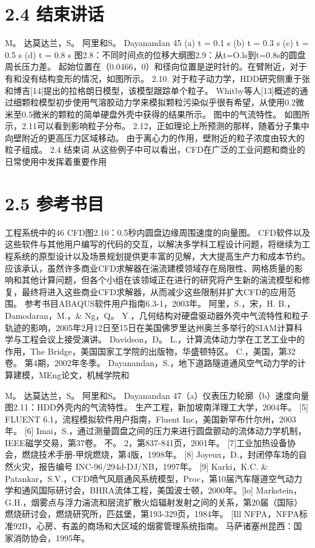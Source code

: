 \documentclass[UTF8,11pt,a4paper,openany,fontset=fandol]{ctexbook}
\begin{document}
\section{2.4 结束讲话}
M。 达莫达兰，S。 阿里和S。 Dayanandan 45 (a) t = 0.1 s (b) t = 0.3 s (c) t = 0.5 s (d) t = 0.8 s 图2.8：不同时间点的位移大纲图2.9：从t=O.ls到t=0.8s的圆盘周长压力差。 起始位置在（0.0466，0）和径向位置是逆时针的。在臂附近，对于有和没有结构变形的情况，如图所示。 2.10. 对于粒子动力学，HDD研究侧重于张和博吉[14]提出的拉格朗日模型，该模型跟踪单个粒子。 Whitby等人[13]概述的通过细颗粒模型初步使用气溶胶动力学来模拟颗粒污染似乎很有希望，从使用0.2微米至0.5微米的颗粒的简单硬盘外壳中获得的结果所示。 图中的气流特性。 如图所示，2.11可以看到影响粒子分布。 2.12，正如理论上所预测的那样，随着分子集中向壁附近的更高压力区域移动。 由于离心力的作用，壁附近的粒子浓度由较大的粒子组成。 2.4 结束词 从这些例子中可以看出，CFD在广泛的工业问题和商业的日常使用中发挥着重要作用

\section{2.5 参考书目}
工程系统中的46 CFD图2.10：0.5秒内圆盘边缘周围速度的向量图。 CFD软件以及这些软件与其他用户编写的代码的交互，以解决多学科工程设计问题，将继续为工程系统的原型设计以及场景规划提供更丰富的见解，大大提高生产力和成本节约。 应该承认，虽然许多商业CFD求解器在湍流建模领域存在局限性、网格质量的影响和其他计算问题，但各个小组在该领域正在进行的研究将产生新的湍流模型和修复，最终将进入这些商业CFD求解器，从而减少这些限制并扩大CFD的应用范围。 参考书目ABAQUS软件用户指南6.3-1，2003年。 阿里，S.，宋，H. B.，Damodaran，M.，\& Ng，Q。 Y.，几何结构对硬盘驱动器外壳中气流特性和粒子轨迹的影响，2005年2月12日至15日在美国佛罗里达州奥兰多举行的SIAM计算科学与工程会议上接受演讲。 Davidson，D。 L.，计算流体动力学在工艺工业中的作用，The Bridge，美国国家工学院的出版物，华盛顿特区。 C.，美国，第32卷。 第4期，2002年冬季。 Dayanandan，S.，地下道路隧道通风空气动力学的计算建模，MEng论文，机械学院和

M。 达莫达兰，S。 阿里和S。 Dayanandan 47（a）仪表压力轮廓（b）速度向量图2.11：HDD外壳内的气流特性。 生产工程，新加坡南洋理工大学，2004年。 [5] FLUENT 6.1，流程模拟软件用户指南，Fluent Inc，美国新罕布什尔州，2003年。 [6] Imai，S.，通过测量圆盘之间的压力来进行圆盘颤动的流体动力学机制，IEEE磁学交易，第37卷。 不。 2，第837-841页，2001年。 [7]工业加热设备协会，燃烧技术手册-甲烷燃烧，第4版，1998年。 [8] Joyeux，D.，封闭停车场的自然火灾，报告编号 INC-96/294d-DJ/NB，1997年。 [9] Karki，K.C. \& Patankar，S.V.，CFD喷气风扇通风系统模型，Proc，第10届汽车隧道空气动力学和通风国际研讨会，BHRA流体工程，美国波士顿，2000年。[lo] Markstein，G.H.，烟雾点与浮力湍流和层流扩散火焰辐射发射之间的关系，第20届（国际）燃烧研讨会，燃烧研究所，匹兹堡，第193-329页，1984年。 [Ill NFPA，NFPA标准92B，心房、有盖的商场和大区域的烟雾管理系统指南。 马萨诸塞州昆西：国家消防协会，1995年。
\end{document}
